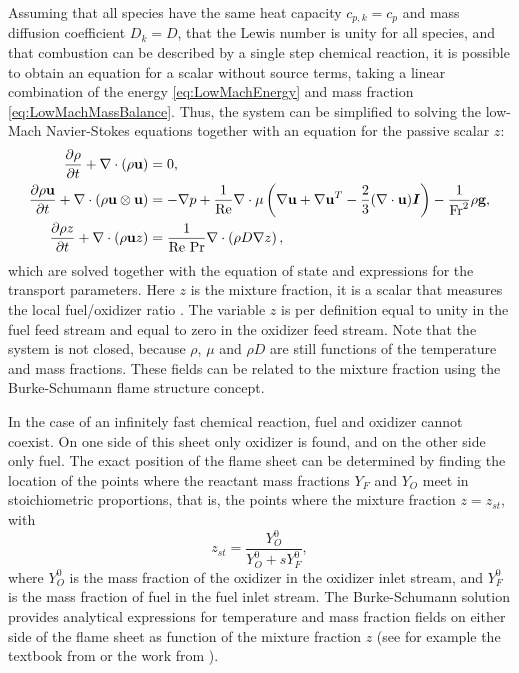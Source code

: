 Assuming that all species have the same heat capacity $c_{p,k} = c_p$ and mass diffusion coefficient $D_k=D$, that the Lewis number is unity for all species, and that combustion can be described by a single step chemical reaction, it is possible to obtain an equation for a scalar without source terms, taking a linear combination of the energy \cref{eq:LowMachEnergy} and mass fraction \cref{eq:LowMachMassBalance}. Thus, the system can be simplified to solving the low-Mach Navier-Stokes equations together with an equation for the passive scalar $z$:
\begin{subequations}
	\begin{align}
		\frac{\partial \rho}{\partial t}+	\nabla \cdot (\rho \textbf{u})                          & = 0, \label{eq:MixtFracConti2}                                                                                                                                                                    \\
		\frac{\partial \rho \textbf{u}}{\partial t} +	\nabla \cdot (\rho \textbf{u} \otimes \textbf{u}) & = - \nabla p + \frac{1}{\text{Re}}\nabla \cdot \mu\left( \nabla \textbf{u} +\nabla \textbf{u}^T  - \frac{2}{3}(\nabla\cdot \textbf{u})\boldsymbol I \right)  - \frac{1}{\text{Fr}^2}\rho\textbf{g},\label{eq:MixtFracMom} \\
		\frac{\partial \rho z}{\partial t}+	\nabla \cdot (\rho \textbf{u}z)                       & = \frac{1}{\text{Re Pr}}\nabla \cdot\left(\rho D \nabla z\right), \label{eq:MixtFracMF}
	\end{align}
	\label{eq:all-eq-mixfrac}
\end{subequations}
which are solved together with the equation of state and expressions for the transport parameters. Here $z$ is the mixture fraction, it is a scalar that measures the local fuel/oxidizer ratio \parencite{poinsotTheoreticalNumericalCombustion2005}. The variable $z$ is per definition equal to unity in the fuel feed stream and equal to zero in the oxidizer feed stream. Note that the system is not closed, because $\rho$, $\mu$ and $\rho D$ are still functions of the temperature and mass fractions. These fields can be related to the mixture fraction using the Burke-Schumann flame structure concept. \parencite{burkeDiffusionFlames1928} 

In the case of an infinitely fast chemical reaction, fuel and oxidizer cannot coexist. On one side of this sheet only oxidizer is found, and on the other side only fuel. The exact position of the flame sheet can be determined by finding the location of the points where the reactant mass fractions $Y_F$ and $Y_O$  meet in stoichiometric proportions, that is, the points where the mixture fraction $z = z_{st}$, with
\begin{equation}
	z_{st} = \frac{Y_O^0}{Y_O^0+sY_F^0},
\end{equation}
where $Y_O^0$ is the mass fraction of the oxidizer in the oxidizer inlet stream, and $Y_F^0$ is the mass fraction of fuel in the fuel inlet stream.
The Burke-Schumann solution provides analytical expressions for temperature and mass fraction fields on either side of the flame sheet as function of the mixture fraction $z$ (see for example the textbook from \textcite{poinsotTheoreticalNumericalCombustion2005} or the work from \textcite{keyesFlameSheetStarting1987}).


